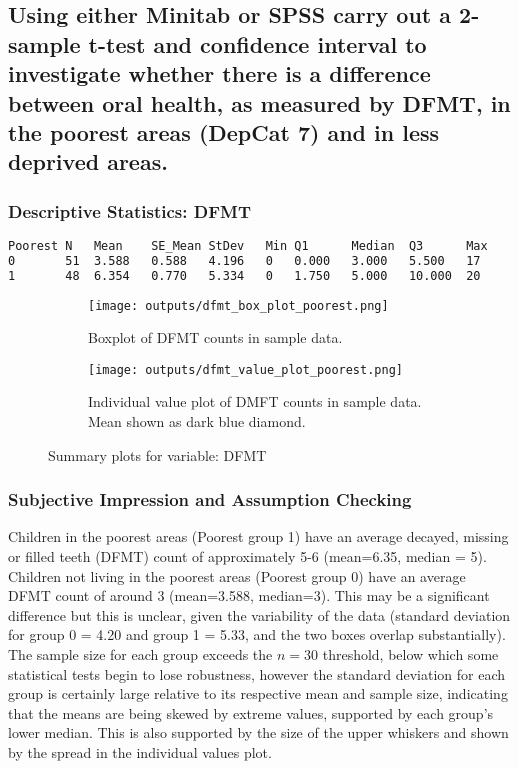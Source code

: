 \documentclass[11pt]{article}
\begin{document}
\newpage
\subsection{Using either Minitab or SPSS carry out a 2-sample t-test and confidence interval to investigate whether there is a difference between oral health, as measured by DFMT, in the poorest areas (DepCat 7) and in less deprived areas.}
\subsubsection*{Descriptive Statistics: DFMT}

\begin{lstlisting}[language=TeX, caption={Summary statistics for DFMT across Poorest groups}]
Poorest N   Mean    SE_Mean StDev   Min Q1      Median  Q3      Max
0       51  3.588   0.588   4.196   0   0.000   3.000   5.500   17
1       48  6.354   0.770   5.334   0   1.750   5.000   10.000  20
\end{lstlisting}

\begin{figure}[ht]
  \begin{subfigure}{0.48\linewidth}
    \centering
    \texttt{[image: outputs/dfmt\_box\_plot\_poorest.png]}
    \caption{Boxplot of DFMT counts in sample data.\newline}
    \label{fig:dfmt_poorest_boxplot}
  \end{subfigure}%
  \hfill
  \begin{subfigure}{0.48\linewidth}
    \centering
    \texttt{[image: outputs/dfmt\_value\_plot\_poorest.png]}
    \caption{Individual value plot of DMFT counts in sample data. Mean shown as dark blue diamond.}
    \label{fig:dfmt_poorest_valueplot}
  \end{subfigure}
  \caption{Summary plots for variable: DFMT}
  \label{fig:dfmt_figures}
\end{figure}
\FloatBarrier  %

\subsubsection*{Subjective Impression and Assumption Checking}
Children in the poorest areas (Poorest group 1) have an average decayed, missing or filled teeth (DFMT) count of approximately 5-6 (mean=6.35, median = 5). Children not living in the poorest areas (Poorest group 0) have an average DFMT count of around 3 (mean=3.588, median=3). This may be a significant difference but this is unclear, given the variability of the data (standard deviation for group 0 = 4.20 and group 1 = 5.33, and the two boxes overlap substantially). The sample size for each group exceeds the $n=30$ threshold, below which some statistical tests begin to lose robustness, however the standard deviation for each group is certainly large relative to its respective mean and sample size, indicating that the means are being skewed by extreme values, supported by each group's lower median. This is also supported by the size of the upper whiskers and shown by the spread in the individual values plot.
\end{document}
